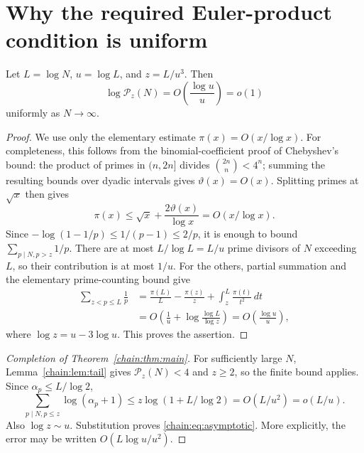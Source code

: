 \section{Why the required Euler-product condition is uniform}
\begin{lemma}\label{chain:lem:tail}
Let $L=\log N$, $u=\log L$, and $z=L/u^3$. Then
\[
\log\mathcal P_z(N)=O\!\left(\frac{\log u}{u}\right)=o(1)
\]
uniformly as $N\to\infty$.
\end{lemma}
\begin{proof}
We use only the elementary estimate $\pi(x)=O(x/\log x)$. For completeness, this follows from the binomial-coefficient proof of Chebyshev's bound: the product of primes in $(n,2n]$ divides $\binom{2n}{n}<4^n$; summing the resulting bounds over dyadic intervals gives $\vartheta(x)=O(x)$. Splitting primes at $\sqrt x$ then gives
\[
\pi(x)\le\sqrt x+\frac{2\vartheta(x)}{\log x}=O(x/\log x).
\]
Since $-\log(1-1/p)\le1/(p-1)\le2/p$, it is enough to bound $\sum_{p\mid N,p>z}1/p$.
There are at most $L/\log L=L/u$ prime divisors of $N$ exceeding $L$, so their contribution is at most $1/u$.
For the others, partial summation and the elementary prime-counting bound give
\[
\begin{aligned}
\sum_{z<p\le L}\frac1p
&=\frac{\pi(L)}{L}-\frac{\pi(z)}z+
\int_z^L\frac{\pi(t)}{t^2}\,dt\\
&=O\!\left(\frac1u+\log\frac{\log L}{\log z}\right)
=O\!\left(\frac{\log u}{u}\right),
\end{aligned}
\]
where $\log z=u-3\log u$. This proves the assertion.
\end{proof}

\begin{proof}[Completion of Theorem~\ref{chain:thm:main}]
For sufficiently large $N$, Lemma~\ref{chain:lem:tail} gives $\mathcal P_z(N)<4$ and $z\ge2$, so the finite bound applies. Since $\alpha_p\le L/\log2$,
\[
\sum_{p\mid N,p\le z}\log(\alpha_p+1)
\le z\log(1+L/\log2)=O(L/u^2)=o(L/u).
\]
Also $\log z\sim u$. Substitution proves \eqref{chain:eq:asymptotic}. More explicitly, the error may be written $O(L\log u/u^2)$.
\end{proof}


